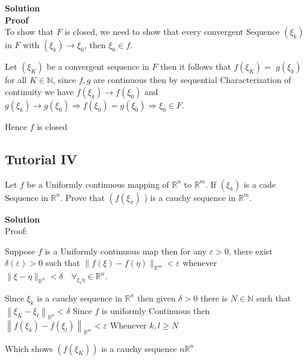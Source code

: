 \documentclass{article}
\begin{document}
\textbf{Solution}\\

\textbf{Proof}\\
To show that $F$ is closed, we need to show that every convergent Sequence $\left(\xi_{k}\right)$ in $F$ with $\left(\xi_{k}\right) \rightarrow \xi_{0}$, then $\xi_{0} \in f$.

Let $\left(\xi_{K}\right)$ be a convergent sequence in $F$ then it follows that $f\left(\xi_{K}\right)=$ $g\left(\xi_{k}\right)$ for all $K \in \mathbb{N}$, since $f, g$ are continuous then by sequential Characterization of continuity we have $f\left(\xi_{k}\right) \rightarrow f\left(\xi_{0}\right)$ and $g\left(\xi_{k}\right) \rightarrow g\left(\xi_{0}\right) \Rightarrow f\left(\xi_{0}\right)=g\left(\xi_{0}\right) \Rightarrow \xi_{0} \in F$.

Hence $f$ is  closed

\subsection{Tutorial IV}
Let $f$ be a Uniformly continuous mapping of $\mathbb{R}^{n}$ to $\mathbb{R}^{m}$. If $\left(\xi_{k}\right)$ is a cade Sequence in $\mathbb{R}^{n}$. Prove that $\left(f\left(\xi_{x}\right)\right.$ ) is a cauchy sequence in $\mathbb{R}^{m}$.

\textbf{Solution}\\

Proof:

Suppose $f$ is a Uniformly continuous map then for any $\varepsilon>0$, 
there exist $\delta(\varepsilon)>0$ such that $\|f(\xi)-f(\eta)\|_{\mathbb{R}^{m}}<\varepsilon$ whenever $\|\xi-\eta\|_{\mathbb{R}^{n}}<\delta \quad \forall_{\xi_{1} \eta} \in \mathbb{R}^{n}$. 

Since $\xi_{k}$ is a cauchy sequence in $\mathbb{R}^{n}$ then given $\delta>0$ there is $N \in \mathbb{N}$ such that $\left\|\xi_{K}-\xi_{l}\right\|_{\mathbb{R}^{n}}<\delta$ Since $f$ is uniformly Continuous then $\left\|f\left(\xi_{k}\right)-f\left(\xi_{l}\right)\right\|_{\mathbb{R}^{m}}<\varepsilon$ Whenever $k, l \geq N$

Which shows $\left(f\left(\xi_{K}\right)\right)$ is a cauchy sequence $n \mathbb{R}^{n}$
\end{document}
